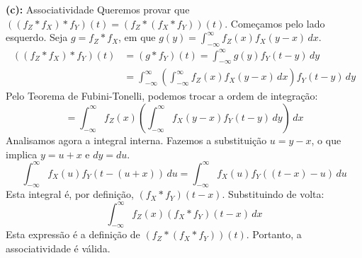 {	{\bf (c):} Associatividade
	Queremos provar que $((f_Z * f_X) * f_Y)(t) = (f_Z * (f_X * f_Y))(t)$.
	Começamos pelo lado esquerdo. Seja $g = f_Z * f_X$, em que $g(y) = \int_{-\infty}^{\infty} f_Z(x) f_X(y-x) \,dx$.
	\begin{align*}
		((f_Z * f_X) * f_Y)(t) &= (g * f_Y)(t) = \int_{-\infty}^{\infty} g(y) f_Y(t-y) \,dy \\
		&= \int_{-\infty}^{\infty} \left( \int_{-\infty}^{\infty} f_Z(x) f_X(y-x) \,dx \right) f_Y(t-y) \,dy
	\end{align*}
	Pelo Teorema de Fubini-Tonelli, podemos trocar a ordem de integração:
	$$ = \int_{-\infty}^{\infty} f_Z(x) \left( \int_{-\infty}^{\infty} f_X(y-x) f_Y(t-y) \,dy \right) \,dx $$
	Analisamos agora a integral interna. Fazemos a substituição $u = y-x$, o que implica $y = u+x$ e $dy = du$.
	$$ \int_{-\infty}^{\infty} f_X(u) f_Y(t-(u+x)) \,du = \int_{-\infty}^{\infty} f_X(u) f_Y((t-x)-u) \,du $$
	Esta integral é, por definição, $(f_X * f_Y)(t-x)$. Substituindo de volta:
	$$ \int_{-\infty}^{\infty} f_Z(x) (f_X * f_Y)(t-x) \,dx $$
	Esta expressão é a definição de $(f_Z * (f_X * f_Y))(t)$. Portanto, a associatividade é válida.
}



%





